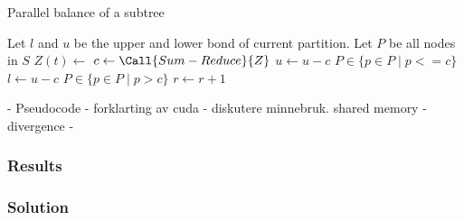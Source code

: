 \begin{algorithm}
\caption{Parallel balance of a subtree}
\label{alg:parallel_balance_subtree}
\begin{algorithmic}
        \State Let $l$ and $u$ be the upper and lower bond of current partition.
        \State Let $P$ be all nodes in $S$
        \Repeat
                \State $Z(t) \gets $  
            \EndFor
            \State $c \gets \Call{Sum-Reduce}{Z}$ 
                \State$ u \gets u-c$
                \State$P \in \{p \in P \mid p <= c\}$
            \Else
                \State$l \gets u-c$
                \State$P \in \{p \in P \mid p > c\}$
            \EndIf
            \State $r \gets r+1$ 
            \State {}
        \State {}
    \EndFunction
\end{algorithmic}
\end{algorithm}



- Pseudocode
- forklarting av cuda
- diskutere minnebruk. shared memory
- divergence
-





\subsubsection{Results} %
\label{ssub:results}




\subsubsection{Solution} %
\label{ssub:solution}



